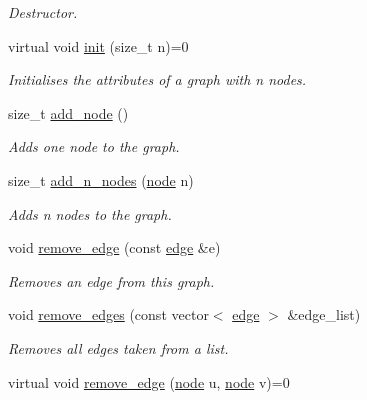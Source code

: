 \begin{DoxyCompactItemize}
\begin{DoxyCompactList}\small\item\em Destructor. \end{DoxyCompactList}\item 
virtual void \hyperlink{classlgraph_1_1utils_1_1xxgraph_a2ac8b3e71fa0550248c692a19ea04d0d}{init} (size\+\_\+t n)=0
\begin{DoxyCompactList}\small\item\em Initialises the attributes of a graph with {\itshape n} nodes. \end{DoxyCompactList}\item 
size\+\_\+t \hyperlink{classlgraph_1_1utils_1_1xxgraph_af41baf2c098e872731ad646aeec1b382}{add\+\_\+node} ()
\begin{DoxyCompactList}\small\item\em Adds one node to the graph. \end{DoxyCompactList}\item 
size\+\_\+t \hyperlink{classlgraph_1_1utils_1_1xxgraph_af4f3782c1a55f73c6f34f2f2c26fb404}{add\+\_\+n\+\_\+nodes} (\hyperlink{namespacelgraph_1_1utils_a7bd66ede3805ef121bc2835bd48de0cf}{node} n)
\begin{DoxyCompactList}\small\item\em Adds {\itshape n} nodes to the graph. \end{DoxyCompactList}\item 
void \hyperlink{classlgraph_1_1utils_1_1xxgraph_af826c05492f237d7727f88ebab033001}{remove\+\_\+edge} (const \hyperlink{namespacelgraph_1_1utils_a6510284ce1b1ae5dc97ce5d2de426e10}{edge} \&e)
\begin{DoxyCompactList}\small\item\em Removes an edge from this graph. \end{DoxyCompactList}\item 
void \hyperlink{classlgraph_1_1utils_1_1xxgraph_a747da8a567d232081199499f23821926}{remove\+\_\+edges} (const vector$<$ \hyperlink{namespacelgraph_1_1utils_a6510284ce1b1ae5dc97ce5d2de426e10}{edge} $>$ \&edge\+\_\+list)
\begin{DoxyCompactList}\small\item\em Removes all edges taken from a list. \end{DoxyCompactList}\item 
virtual void \hyperlink{classlgraph_1_1utils_1_1xxgraph_a722693838fb7cfbd5b78c293fffc2413}{remove\+\_\+edge} (\hyperlink{namespacelgraph_1_1utils_a7bd66ede3805ef121bc2835bd48de0cf}{node} u, \hyperlink{namespacelgraph_1_1utils_a7bd66ede3805ef121bc2835bd48de0cf}{node} v)=0

\end{DoxyCompactItemize}
